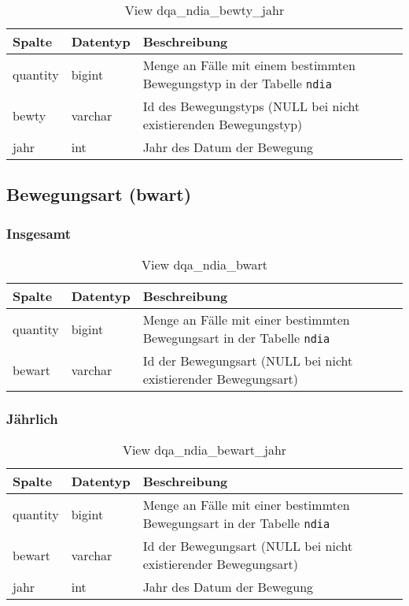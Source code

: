 \begin{table}[ht]
	\centering   
	\caption{View dqa\_ndia\_bewty\_jahr}
	\label{tab:bewBtyJ}
	\begin{tabular}{||l|l|p{10cm}||}   		
		\hline
		Spalte & Datentyp & Beschreibung \\ [0.5ex]
		\hline\hline
		quantity & bigint & Menge an Fälle mit einem bestimmten Bewegungstyp in der Tabelle \texttt{ndia}\\
		\hline
		bewty & varchar & Id des Bewegungstyps (NULL bei nicht existierenden Bewegungstyp)\\
		\hline
		jahr & int &  Jahr des Datum der Bewegung \\
		\hline		
	\end{tabular}
\end{table}

\subsection{Bewegungsart (bwart)} \label{subsec:bewart}

\subsubsection{Insgesamt} \label{subsubsec:bewartI}

\begin{table}[ht]
	\centering   
	\caption{View dqa\_ndia\_bwart}
	\label{tab:bewArtI}
	\begin{tabular}{||l|l|p{10cm}||}   		
		\hline
		Spalte & Datentyp & Beschreibung \\ [0.5ex]
		\hline\hline
		quantity & bigint & Menge an Fälle mit einer bestimmten Bewegungsart in der Tabelle \texttt{ndia} \\
		\hline
		bewart & varchar & Id der Bewegungsart (NULL bei nicht existierender Bewegungsart)\\
		\hline
		
	\end{tabular}
\end{table}


\subsubsection{Jährlich} \label{subsubsec:bewartJ}

\begin{table}[ht]
	\centering   
	\caption{View dqa\_ndia\_bewart\_jahr}
	\label{tab:bewArtJ}
	\begin{tabular}{||l|l|p{10cm}||}   		
		\hline
		Spalte & Datentyp & Beschreibung \\ [0.5ex]
		\hline\hline
		quantity & bigint & Menge an Fälle mit einer bestimmten Bewegungsart in der Tabelle \texttt{ndia}\\
		\hline
		bewart & varchar & Id der Bewegungsart (NULL bei nicht existierender Bewegungsart)\\
		\hline
		jahr & int &  Jahr des Datum der Bewegung \\
		\hline		
	\end{tabular}
\end{table}

